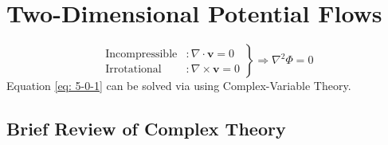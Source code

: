 \chapter{Two-Dimensional Potential Flows}
\begin{equation}
\left.
\begin{aligned}
\text{Incompressible}&\colon\nabla\cdot\mathbf{v} = 0\\
\text{Irrotational}&\colon\nabla\times\mathbf{v} = 0
\end{aligned}
\right\}
\Longrightarrow\nabla^2\Phi = 0
\label{eq: 5-0-1}
\end{equation}
Equation \eqref{eq: 5-0-1} can be solved via using Complex-Variable Theory. 
\section{Brief Review of Complex Theory}
